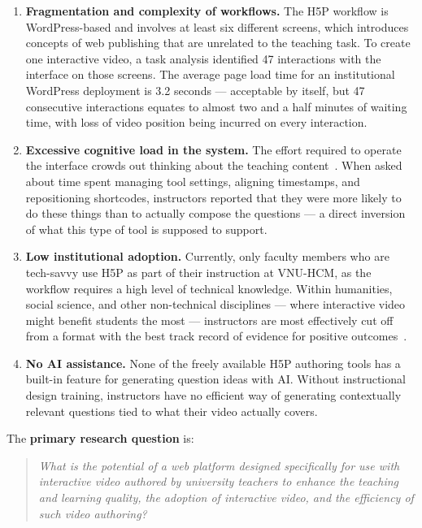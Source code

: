 \begin{enumerate}
  \item \textbf{Fragmentation and complexity of workflows.} The H5P workflow is WordPress-based and involves at least six different screens, which introduces concepts of web publishing that are unrelated to the teaching task. To create one interactive video, a task analysis identified 47 interactions with the interface on those screens. The average page load time for an institutional WordPress deployment is 3.2 seconds --- acceptable by itself, but 47 consecutive interactions equates to almost two and a half minutes of waiting time, with loss of video position being incurred on every interaction.

  \item \textbf{Excessive cognitive load in the system.} The effort required to operate the interface crowds out thinking about the teaching content~\cite{chandler1991,mayer2009}. When asked about time spent managing tool settings, aligning timestamps, and repositioning shortcodes, instructors reported that they were more likely to do these things than to actually compose the questions --- a direct inversion of what this type of tool is supposed to support.

  \item \textbf{Low institutional adoption.} Currently, only faculty members who are tech-savvy use H5P as part of their instruction at VNU-HCM, as the workflow requires a high level of technical knowledge. Within humanities, social science, and other non-technical disciplines --- where interactive video might benefit students the most --- instructors are most effectively cut off from a format with the best track record of evidence for positive outcomes~\cite{davis1989,hadullo2017}.

  \item \textbf{No AI assistance.} None of the freely available H5P authoring tools has a built-in feature for generating question ideas with AI. Without instructional design training, instructors have no efficient way of generating contextually relevant questions tied to what their video actually covers.
\end{enumerate}

The \textbf{primary research question} is:

\begin{quote}
  \itshape What is the potential of a web platform designed specifically for use with interactive
  video authored by university teachers to enhance the teaching and learning quality, the
  adoption of interactive video, and the efficiency of such video authoring?
\end{quote}

